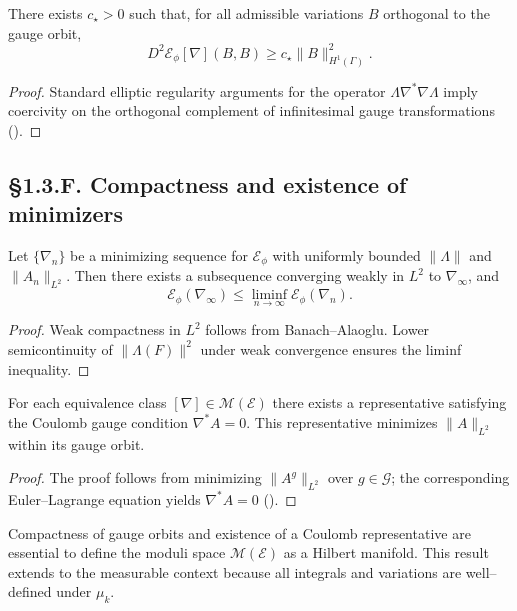 \begin{theorem}\label{thm:1.3.hessian}
There exists $c_\star>0$ such that, for all admissible variations $B$ orthogonal to the gauge orbit,
\[
D^2\mathcal E_\phi[\nabla](B,B)\ge c_\star \|B\|_{H^1(\Gamma)}^2.
\]
\end{theorem}

\begin{proof}
Standard elliptic regularity arguments for the operator $\Lambda\nabla^\ast\nabla\Lambda$ imply coercivity on the orthogonal complement of infinitesimal gauge transformations (\cite{DonaldsonKronheimer,LockhartMcOwen}).
\end{proof}

\subsection*{§1.3.F. Compactness and existence of minimizers}

\begin{theorem}\label{thm:1.3.min}
Let $\{\nabla_n\}$ be a minimizing sequence for $\mathcal{E}_\phi$ with uniformly bounded $\|\Lambda\|$ and $\|A_n\|_{L^2}$.  
Then there exists a subsequence converging weakly in $L^2$ to $\nabla_\infty$, and
\[
\mathcal{E}_\phi(\nabla_\infty)\le\liminf_{n\to\infty}\mathcal{E}_\phi(\nabla_n).
\]
\end{theorem}

\begin{proof}
Weak compactness in $L^2$ follows from Banach–Alaoglu.  
Lower semicontinuity of $\|\Lambda(F)\|^2$ under weak convergence ensures the liminf inequality.
\end{proof}

\begin{lemma}\label{lem:1.3.gaugefix}
For each equivalence class $[\nabla]\in\mathcal M(\mathcal E)$ there exists a representative satisfying the Coulomb gauge condition $\nabla^\ast A=0$.  
This representative minimizes $\|A\|_{L^2}$ within its gauge orbit.
\end{lemma}

\begin{proof}
The proof follows from minimizing $\|A^g\|_{L^2}$ over $g\in\mathcal G$; the corresponding Euler–Lagrange equation yields $\nabla^\ast A=0$ (\cite{Uhlenbeck1982}).
\end{proof}

\begin{remark}
Compactness of gauge orbits and existence of a Coulomb representative are essential to define the moduli space $\mathcal M(\mathcal E)$ as a Hilbert manifold.  
This result extends to the measurable context because all integrals and variations are well–defined under $\mu_k$.
\end{remark}


